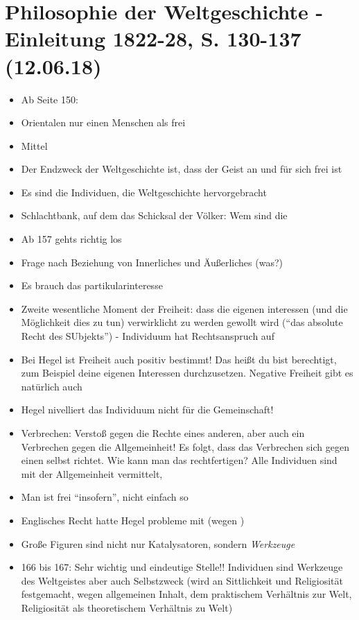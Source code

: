 \documentclass[emulatestandardclasses]{scrartcl}
\begin{document}
\section{Philosophie der Weltgeschichte - Einleitung 1822-28, S. 130-137\\(12.06.18)}


\begin{itemize}
  \item Ab Seite 150:
  \item Orientalen nur einen Menschen als frei
  \item Mittel 
  \item Der Endzweck der Weltgeschichte ist, dass der Geist an und für sich frei ist
  \item Es sind die Individuen, die Weltgeschichte hervorgebracht
  \item Schlachtbank, auf dem das Schicksal der Völker: Wem sind die
  \item Ab 157 gehts richtig los
  \item Frage nach Beziehung von Innerliches und Äußerliches (was?)
  \item Es brauch das partikularinteresse
  \item Zweite wesentliche Moment der Freiheit: dass die eigenen interessen (und die Möglichkeit dies zu tun) verwirklicht zu werden gewollt wird ("`das absolute Recht des SUbjekts"') - Individuum hat Rechtsanspruch auf 
  \item Bei Hegel ist Freiheit auch positiv bestimmt! Das heißt du bist berechtigt, zum Beispiel deine eigenen Interessen durchzusetzen. Negative Freiheit gibt es natürlich auch
  \item Hegel nivelliert das Individuum nicht für die Gemeinschaft!
  \item Verbrechen: Verstoß gegen die Rechte eines anderen, aber auch ein Verbrechen gegen die Allgemeinheit! Es folgt, dass das Verbrechen sich gegen einen selbst richtet. Wie kann man das rechtfertigen? Alle Individuen sind mit der Allgemeinheit vermittelt, 
  \item Man ist frei "`insofern"', nicht einfach so
  \item Englisches Recht hatte Hegel probleme mit (wegen )
  \item Große Figuren sind nicht nur Katalysatoren, sondern \emph{Werkzeuge}
  \item 166 bis 167: Sehr wichtig und eindeutige Stelle!! Individuen sind Werkzeuge des Weltgeistes aber auch Selbstzweck (wird an Sittlichkeit und Religiosität festgemacht, wegen allgemeinen Inhalt, dem praktischem Verhältnis zur Welt, Religiosität als theoretischem Verhältnis zu Welt)

\end{itemize}
\end{document}
